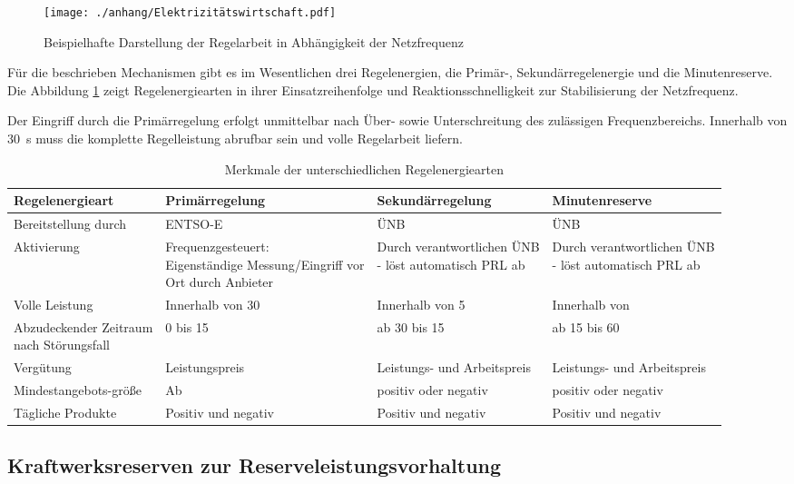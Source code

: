 		\begin{figure} [H]
			\centering
			\label{Abb. Reaktionskette Regelenergien}
			\texttt{[image: ./anhang/Elektrizitätswirtschaft.pdf]}
			\caption{Beispielhafte Darstellung der Regelarbeit in Abhängigkeit der Netzfrequenz \parencite{Elektrizitätswirtschaft}}
		\end{figure}
		
		Für die beschrieben Mechanismen gibt es im Wesentlichen drei Regelenergien, die Primär-, Sekundärregelenergie und die Minutenreserve.
		Die Abbildung \ref{Abb. Reaktionskette Regelenergien} zeigt Regelenergiearten in ihrer Einsatzreihenfolge und Reaktionsschnelligkeit zur Stabilisierung der Netzfrequenz.
		
		Der Eingriff durch die Primärregelung erfolgt unmittelbar nach Über- sowie Unterschreitung des zulässigen Frequenzbereichs. 
		Innerhalb von \SI{30}{\second} muss die komplette Regelleistung abrufbar sein und volle Regelarbeit liefern.
		
		
		\begin{table}[H]
			\caption{Merkmale der unterschiedlichen Regelenergiearten}
			\label{Merkmale der unterschiedlichen Regelenergiearten}
			\begin{tabular}{llll}
				\hline
				Regelenergieart & Primärregelung & Sekundärregelung & Minutenreserve \\ \hline
				Bereitstellung durch & ENTSO-E & ÜNB & ÜNB \\
				Aktivierung & \makecell[l]{Frequenzgesteuert: \\ Eigenständige Messung/Eingriff vor \\ Ort durch Anbieter} & \makecell[l]{Durch verantwortlichen ÜNB \\ - löst automatisch PRL ab} & \makecell[l]{Durch verantwortlichen ÜNB \\ - löst automatisch PRL ab}\\
				Volle Leistung & Innerhalb von 30 & Innerhalb von 5 & Innerhalb von \\
				\makecell[l]{Abzudeckender Zeitraum \\ nach Störungsfall} & 0 bis 15 & ab 30 bis 15 & ab 15 bis 60 \\
				Vergütung & Leistungspreis & Leistungs- und Arbeitspreis & Leistungs- und Arbeitspreis \\
				Mindestangebots-größe & Ab & positiv oder negativ & positiv oder negativ \\
				Tägliche Produkte & \multicolumn{1}{l}{Positiv und negativ} & Positiv und negativ & Positiv und negativ \\ \hline
			\end{tabular}
		\end{table}
		
		
		
		
		
	
	\subsection{Kraftwerksreserven zur Reserveleistungsvorhaltung}